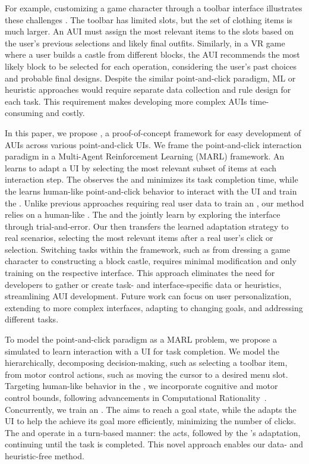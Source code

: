 For example, customizing a game character through a toolbar interface illustrates these challenges . The toolbar has limited slots, but the set of clothing items is much larger. An AUI must assign the most relevant items to the slots based on the user's previous selections and likely final outfits. Similarly, in a VR game where a user builds a castle from different blocks, the AUI recommends the most likely block to be selected for each operation, considering the user's past choices and probable final designs. Despite the similar point-and-click paradigm, ML or heuristic approaches would require separate data collection and rule design for each task. This requirement makes developing more complex AUIs time-consuming and costly.

In this paper, we propose \marlui, a proof-of-concept framework for easy development of AUIs across various point-and-click UIs. We frame the point-and-click interaction paradigm in a Multi-Agent Reinforcement Learning (MARL) framework. An \interfaceagent learns to adapt a UI by selecting the most relevant subset of items at each interaction step. The \interfaceagent observes the \useragent and minimizes its task completion time, while the \useragent learns human-like point-and-click behavior to interact with the UI and train the \interfaceagent. Unlike previous approaches requiring real user data to train an \interfaceagent, our method relies on a human-like \useragent. The \useragent and the \interfaceagent jointly learn by exploring the interface through trial-and-error. Our \interfaceagent then transfers the learned adaptation strategy to real scenarios, selecting the most relevant items after a real user's click or selection. Switching tasks within the \marlui framework, such as from dressing a game character to constructing a block castle, requires minimal modification and only training on the respective interface. This approach eliminates the need for developers to gather or create task- and interface-specific data or heuristics, streamlining AUI development. Future work can focus on user personalization, extending to more complex interfaces, adapting to changing goals, and addressing different tasks.

To model the point-and-click paradigm as a MARL problem, we propose a simulated \useragent to learn interaction with a UI for task completion. We model the \useragent hierarchically, decomposing decision-making, such as selecting a toolbar item, from motor control actions, such as moving the cursor to a desired menu slot. Targeting human-like behavior in the \useragent, we incorporate cognitive and motor control bounds, following advancements in Computational Rationality~\cite{oulasvirta2022computational}. Concurrently, we train an \interfaceagent. The \useragent aims to reach a goal state, while the \interfaceagent adapts the UI to help the \useragent achieve its goal more efficiently, minimizing the number of clicks. The \useragent and \interfaceagent operate in a turn-based manner: the \useragent acts, followed by the \interfaceagent's adaptation, continuing until the task is completed. This novel approach enables our data- and heuristic-free method.

